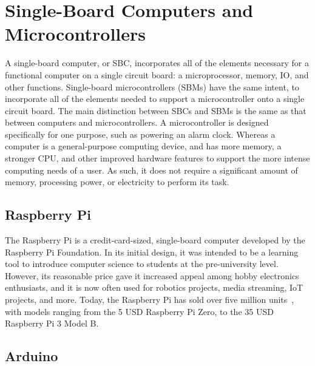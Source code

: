 \documentclass[12pt]{report}
\let\Oldsection\section
\renewcommand{\section}{\FloatBarrier\Oldsection}
\let\Oldsubsection\subsection
\renewcommand{\subsection}{\FloatBarrier\Oldsubsection}
\begin{document}

\section{Single-Board Computers and Microcontrollers} \label{single-board-computers-and-microcontrollers}

A single-board computer, or SBC, incorporates all of the elements necessary for a functional 
computer on a single circuit board: a microprocessor, memory, IO, and other functions. Single-board microcontrollers
(SBMs) have the same intent, to incorporate all of the elements needed to support a microcontroller onto a single
circuit board. The main distinction between SBCs and SBMs is the same as that between computers and microcontrollers.
A microcontroller is designed specifically for one  purpose, such as powering an alarm clock. Whereas a
computer is a general-purpose computing device, and has more memory, a stronger CPU, and other improved hardware 
features to support the more intense computing needs of a user. As such, it does not require a significant amount of
memory, processing power, or electricity to perform its task.


\subsection{Raspberry Pi} \label{raspberry-pi}

The Raspberry Pi is a credit-card-sized, single-board computer developed by the Raspberry Pi Foundation. In its initial 
design, it was intended to be a learning tool to introduce computer science to students at the pre-university  
level. However, its reasonable price gave it increased appeal among hobby electronics enthusiasts, and it is now often 
used for robotics projects, media streaming, IoT projects, and more. Today, the Raspberry Pi has sold over five million 
units~\autocite{RPISALES}, with models ranging from the 5 USD Raspberry Pi Zero, to the 35 USD Raspberry Pi 3 Model B.


\subsection{Arduino} \label{arduino}
\end{document}
